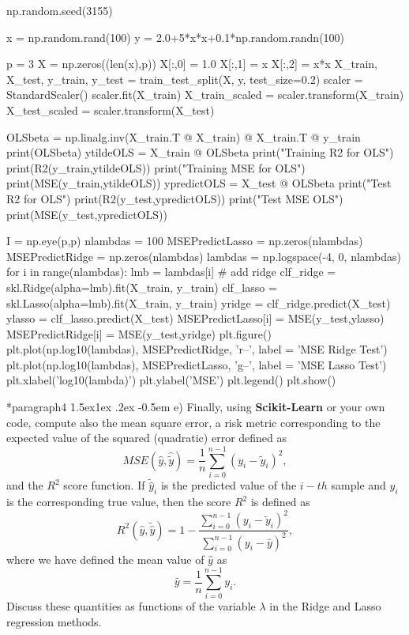 \documentclass[%
oneside,                 %
final,                   %
10pt]{article}
\makeatletter
\newenvironment{doconceexercise}{}{}
\newcommand\subex{\@startsection*{paragraph}{4}{\z@}%
                  {1.5ex\@plus1ex \@minus.2ex}%
                  {-0.5em}%
                  {\normalfont\normalsize\bfseries}}
\makeatother
\begin{document}
\begin{doconceexercise}
np.random.seed(3155)

x = np.random.rand(100)
y = 2.0+5*x*x+0.1*np.random.randn(100)

p = 3
X = np.zeros((len(x),p))
X[:,0] = 1.0
X[:,1] = x
X[:,2] = x*x
X_train, X_test, y_train, y_test = train_test_split(X, y, test_size=0.2)
scaler = StandardScaler()
scaler.fit(X_train)
X_train_scaled = scaler.transform(X_train)
X_test_scaled = scaler.transform(X_test)

OLSbeta = np.linalg.inv(X_train.T @ X_train) @ X_train.T @ y_train
print(OLSbeta)
ytildeOLS = X_train @ OLSbeta
print("Training R2 for OLS")
print(R2(y_train,ytildeOLS))
print("Training MSE for OLS")
print(MSE(y_train,ytildeOLS))
ypredictOLS = X_test @ OLSbeta
print("Test R2 for OLS")
print(R2(y_test,ypredictOLS))
print("Test MSE OLS")
print(MSE(y_test,ypredictOLS))

I = np.eye(p,p)
nlambdas = 100
MSEPredictLasso = np.zeros(nlambdas)
MSEPredictRidge = np.zeros(nlambdas)
lambdas = np.logspace(-4, 0, nlambdas)
for i in range(nlambdas):
    lmb = lambdas[i]
    # add ridge
    clf_ridge = skl.Ridge(alpha=lmb).fit(X_train, y_train)
    clf_lasso = skl.Lasso(alpha=lmb).fit(X_train, y_train)
    yridge = clf_ridge.predict(X_test)
    ylasso = clf_lasso.predict(X_test)
    MSEPredictLasso[i] = MSE(y_test,ylasso)
    MSEPredictRidge[i] = MSE(y_test,yridge)
plt.figure()
plt.plot(np.log10(lambdas), MSEPredictRidge, 'r--', label = 'MSE Ridge Test')
plt.plot(np.log10(lambdas), MSEPredictLasso, 'g--', label = 'MSE Lasso Test')
plt.xlabel('log10(lambda)')
plt.ylabel('MSE')
plt.legend()
plt.show()

\subex{e)}
Finally, using \textbf{Scikit-Learn} or your own code, compute also the mean square error, a risk metric corresponding to the expected value of the squared (quadratic) error defined as
\[ MSE(\hat{y},\hat{\tilde{y}}) = \frac{1}{n}
\sum_{i=0}^{n-1}(y_i-\tilde{y}_i)^2, 
\] 
and the $R^2$ score function.
If $\tilde{\hat{y}}_i$ is the predicted value of the $i-th$ sample and $y_i$ is the corresponding true value, then the score $R^2$ is defined as
\[
R^2(\hat{y}, \tilde{\hat{y}}) = 1 - \frac{\sum_{i=0}^{n - 1} (y_i - \tilde{y}_i)^2}{\sum_{i=0}^{n - 1} (y_i - \bar{y})^2},
\]
where we have defined the mean value  of $\hat{y}$ as
\[
\bar{y} =  \frac{1}{n} \sum_{i=0}^{n - 1} y_i.
\]
Discuss these quantities as functions of the variable $\lambda$ in the Ridge and Lasso regression methods.



\end{doconceexercise}
\end{document}
